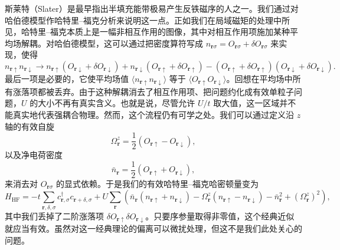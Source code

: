 斯莱特（Slater）是最早指出半填充能带极易产生反铁磁序的人之一。我们通过对哈伯德模型作哈特里--福克分析来说明这一点。正如我们在局域磁矩的处理中所见，哈特里--福克本质上是一幅非相互作用的图像，其中对相互作用项施加某种平均场解耦。对哈伯德模型，这可以通过把密度算符写成 $n_{\mathbf{r}\sigma}=O_{\mathbf{r}\sigma}+\delta O_{\mathbf{r}\sigma}$ 来实现，使得
\begin{equation*}
n_{\mathbf{r}\uparrow}n_{\mathbf{r}\downarrow}\to n_{\mathbf{r}\uparrow}(O_{\mathbf{r}\downarrow}+\delta O_{\mathbf{r}\downarrow})+n_{\mathbf{r}\downarrow}(O_{\mathbf{r}\uparrow}+\delta O_{\mathbf{r}\uparrow})-(O_{\mathbf{r}\uparrow}+\delta O_{\mathbf{r}\uparrow})(O_{\mathbf{r}\downarrow}+\delta O_{\mathbf{r}\downarrow}).\tag{16.59}
\end{equation*}
最后一项是必要的，它使平均场值 $\langle n_{\mathbf{r}\uparrow}n_{\mathbf{r}\downarrow}\rangle$ 等于 $\langle O_{\mathbf{r}\uparrow}O_{\mathbf{r}\downarrow}\rangle$。回想在平均场中所有涨落项都被丢弃。由于这种解耦消去了相互作用项、把问题约化成有效单粒子问题，$U$ 的大小不再有真实含义。也就是说，尽管允许 $U/t$ 取大值，这一区域并不能真实地代表强耦合物理。然而，这个流程仍有可学之处。我们可以通过定义沿 $z$ 轴的有效自旋
\begin{equation*}
\Omega^{z}_{\mathbf{r}}=\frac{1}{2}(O_{\mathbf{r}\uparrow}-O_{\mathbf{r}\downarrow}),\tag{16.60}
\end{equation*}
以及净电荷密度
\begin{equation*}
\bar{n}_{\mathbf{r}}=\frac{1}{2}(O_{\mathbf{r}\uparrow}+O_{\mathbf{r}\downarrow}),\tag{16.61}
\end{equation*}
来消去对 $O_{\mathbf{r}\sigma}$ 的显式依赖。于是我们的有效哈特里--福克哈密顿量变为
\begin{equation*}
H_{\mathrm{HF}}=-t\sum_{\mathbf{r},\delta,\sigma}c^{\dagger}_{\mathbf{r},\sigma}c_{\mathbf{r}+\delta,\sigma}+U\sum_{\mathbf{r}}\left(\bar{n}_{\mathbf{r}}(n_{\mathbf{r}\uparrow}+n_{\mathbf{r}\downarrow})-\Omega^{z}_{\mathbf{r}}(n_{\mathbf{r}\uparrow}-n_{\mathbf{r}\downarrow})-\bar{n}^{2}_{\mathbf{r}}+(\Omega^{z}_{\mathbf{r}})^{2}\right),\tag{16.62}
\end{equation*}
其中我们丢掉了二阶涨落项 $\delta O_{\mathbf{r}\uparrow}\delta O_{\mathbf{r}\downarrow}$。只要序参量取得非零值，这个经典近似就应当有效。虽然对这一经典理论的偏离可以微扰处理，但这不是我们此处关心的问题。

